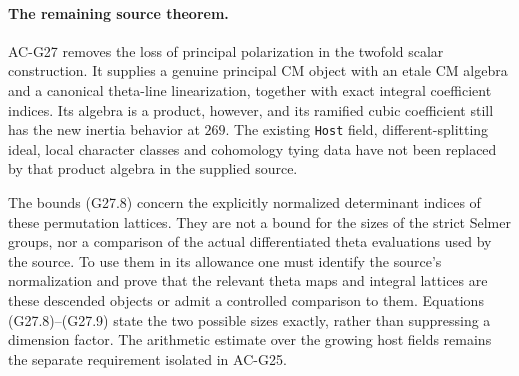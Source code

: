 \paragraph{The remaining source theorem.}
AC-G27 removes the loss of principal polarization in the
twofold scalar construction.  It supplies a genuine principal
CM object with an etale CM algebra and a canonical theta-line
linearization, together with exact integral coefficient indices.
Its algebra is a product, however, and its ramified cubic
coefficient still has the new inertia behavior at $269$.
The existing \texttt{Host} field, different-splitting ideal,
local character classes and cohomology tying data have not been
replaced by that product algebra in the supplied source.

The bounds (G27.8) concern the explicitly normalized determinant
indices of these permutation lattices.  They are not a bound
for the sizes of the strict Selmer groups, nor a comparison of
the actual differentiated theta evaluations used by the source.
To use them in its allowance one must identify the source's
normalization and prove that the relevant theta maps and integral
lattices are these descended objects or admit a controlled
comparison to them.  Equations (G27.8)--(G27.9) state the two
possible sizes exactly, rather than suppressing a dimension
factor.  The arithmetic estimate over the growing host fields
remains the separate requirement isolated in AC-G25.
